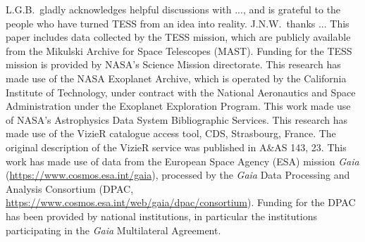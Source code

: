 \documentclass[12pt,twocolumn,tighten]{aastex62}
\begin{document}
\acknowledgements
L.G.B.\ gladly acknowledges helpful discussions with
..., and is
grateful to the people who have turned TESS from an idea into reality.
%
J.N.W.\ thanks ...
%
This paper includes data collected by the TESS mission, which are
publicly available from the Mikulski Archive for Space Telescopes
(MAST).
%
Funding for the TESS mission is provided by NASA's Science Mission
directorate.
%
This research has made use of the NASA Exoplanet Archive, which is
operated by the California Institute of Technology, under contract
with the National Aeronautics and Space Administration under the
Exoplanet Exploration Program.
%
This work made use of NASA's Astrophysics Data System Bibliographic
Services.
%
This research has made use of the VizieR catalogue access tool, CDS,
Strasbourg, France. The original description of the VizieR service was
published in A\&AS 143, 23.
%
This work has made use of data from the European Space Agency (ESA)
mission {\it Gaia} (\url{https://www.cosmos.esa.int/gaia}), processed
by the {\it Gaia} Data Processing and Analysis Consortium (DPAC,
\url{https://www.cosmos.esa.int/web/gaia/dpac/consortium}). Funding
for the DPAC has been provided by national institutions, in particular
the institutions participating in the {\it Gaia} Multilateral
Agreement.
%
\newline
%
%

                            
 

\appendix
\end{document}
